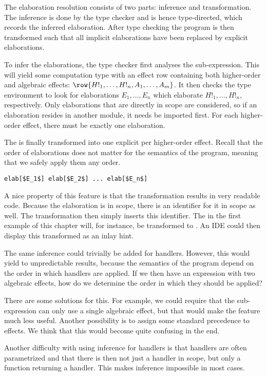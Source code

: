 The elaboration resolution consists of two parts: inference and transformation. The inference is done by the type checker and is hence type-directed, which records the inferred elaboration. After type checking the program is then transformed such that all implicit elaborations have been replaced by explicit elaborations.

To infer the elaborations, the type checker first analyses the sub-expression. This will yield some computation type with an effect row containing both higher-order and algebraic effects: $\row{H!_1, \dots, H!_n, A_1, \dots, A_m}$. It then checks the type environment to look for elaborations $E_1, \dots, E_n$ which elaborate $H!_1, \dots, H!_n$, respectively. Only elaborations that are directly in scope are considered, so if an elaboration resides in another module, it needs be imported first. For each higher-order effect, there must be exactly one elaboration.

The  is finally transformed into one explicit  per higher-order effect. Recall that the order of elaborations does not matter for the semantics of the program, meaning that we safely apply them any order.

\begin{lstlisting}[language=elaine,style=fancy]
elab[$E_1$] elab[$E_2$] ... elab[$E_n$]
\end{lstlisting}

A nice property of this feature is that the transformation results in very readable code. Because the elaboration is in scope, there is an identifier for it in scope as well. The transformation then simply inserts this identifier. The \elab in the first example of this chapter will, for instance, be transformed to . An IDE could then display this transformed  as an inlay hint.


The same inference could trivially be added for handlers. However, this would yield to unpredictable results, because the semantics of the program depend on the order in which handlers are applied. If we then have an expression with two algebraic effects, how do we determine the order in which they should be applied?

There are some solutions for this. For example, we could require that the sub-expression can only use a single algebraic effect, but that would make the feature much less useful. Another possibility is to assign some standard precedence to effects. We think that this would become quite confusing in the end.

Another difficulty with using inference for handlers is that handlers are often parametrized and that there is then not just a handler in scope, but only a function returning a handler. This makes inference impossible in most cases.